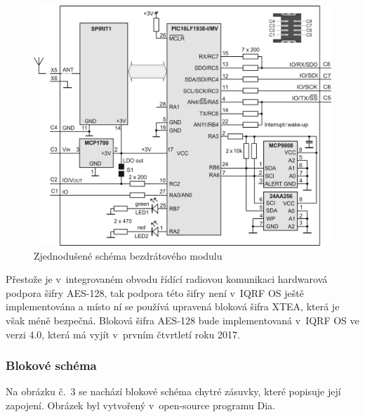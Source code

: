 \documentclass[12pt,a4paper,oneside]{article}
\begin{document}
\begin{figure}[H]
\centering
\label{fig:iqrf/zjednodusene-schema}
\includegraphics[width = 128mm]{img/iqrf/dctr-72dat-zjednodusene-schema.png}
\caption{Zjednodušené schéma bezdrátového modulu}
\end{figure}

Přestože je v~integrovaném obvodu řídící radiovou komunikaci hardwarová podpora šifry AES-128, tak podpora této šifry není v~IQRF OS ještě implementována a místo ní se používá upravená bloková šifra XTEA, která je však méně bezpečná. Bloková šifra AES-128 bude implementovaná v~IQRF OS ve verzi 4.0, která má vyjít v~prvním čtvrtletí roku 2017.

\newpage

\subsubsection{Blokové schéma}

Na obrázku č.~3 se nachází blokové schéma chytré zásuvky, které popisuje její zapojení. Obrázek byl vytvořený v~open-source programu Dia\cite{sw/dia}.
\end{document}
